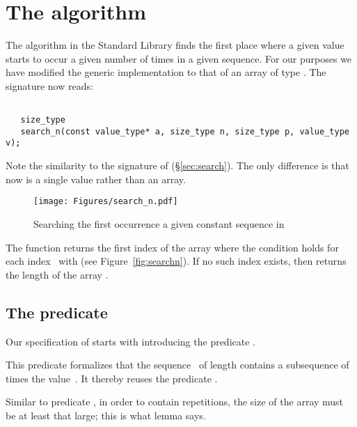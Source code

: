 
\section{The \searchn algorithm}

The \searchn algorithm in the \cxx Standard Library \cite[\S
28.5.13]{cxx-17-draft} finds
the first place where a given value starts to occur a given number of
times in a given sequence.
For our purposes we have modified
the generic implementation
to that of an array of type .
The signature now reads:

\begin{lstlisting}[style = acsl-block]

   size_type
   search_n(const value_type* a, size_type n, size_type p, value_type v);
\end{lstlisting}

Note the similarity to the signature of \search (\S\ref{sec:search}).
The only difference is that  now is a single value rather than
an array.

\begin{figure}[hbt]
\centering
\texttt{[image: Figures/search\_n.pdf]}
\caption{ Searching the first occurrence a given constant sequence in }
\end{figure}

\FloatBarrier

The function \searchn returns the first
index  of the array  where the condition 
holds for each index~ with  (see Figure~\ref{fig:searchn}).
If no such index exists, then \searchn returns the length
 of the array .


\subsection{The predicate \HasConstantSubRange}

Our specification of \searchn starts with introducing the
predicate 
.



This predicate formalizes that the sequence~ of length 
contains a subsequence of  times the value~.
It thereby reuses the predicate
.

Similar to predicate 
,
in order to contain  repetitions, the size of the
array  must be at least that large;
this is what lemma 
 says.

